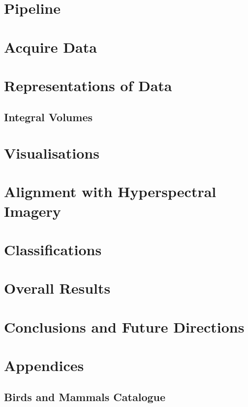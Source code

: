 \documentclass{article}
\begin{document}
    \section{Pipeline}\label{Pipeline}
	    
	    \newpage
    \section{Acquire Data}\label{AcquireData}
	    
	    \newpage
    \section{Representations of Data}\label{Representations}
	    
	    \newpage
		 \subsection{Integral Volumes}\label{Rep_IntegralVolumes}
		 	
		 		\newpage
		 		
	\section{Visualisations}\label{Visualisations}
		
		\newpage
	\section{Alignment with Hyperspectral Imagery}\label{Alignment}
		
		\newpage		
	\section{Classifications}\label{Classifications}
		
		\newpage
	\section{Overall Results}\label{Results}
		
		\newpage
	\section{Conclusions and Future Directions}\label{Conclusions}
		
		\newpage

	    
	    {}

		\newpage
	\section{Appendices}\label{Apendices}
		\subsection{Birds and Mammals Catalogue} 
		\label{AppendixBirds}
		\newpage
	
		
	
    
\end{document}
